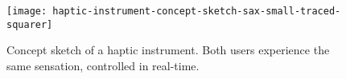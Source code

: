 %
%
%


\begin{figure}[h] %
   \centering
   \texttt{[image: haptic-instrument-concept-sketch-sax-small-traced-squarer]} 
   \caption{Concept sketch of a haptic instrument. Both users experience the same sensation, controlled in real-time.}
   \label{fig:HapticInstrumentConceptSketch}
\end{figure}


